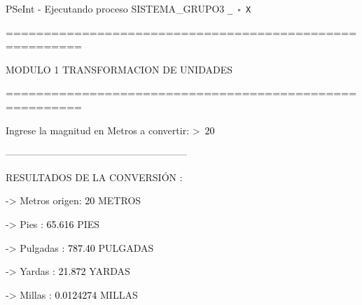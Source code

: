 \documentclass[12pt,a4paper]{article}
\newcommand{\consola}[1]{\noindent\textcolor{pseString}{#1}}
\newcommand{\entrada}[1]{\textcolor{black}{#1}}
\newenvironment{PSeIntWindow}{%
	\begin{tcolorbox}[
		breakable,
		enhanced,
		colback=white,
		colframe=black!60,
		boxrule=0.5pt,
		arc=1mm,
		left=0mm,
		right=0mm,
		top=0mm,
		bottom=2mm,
		width=\textwidth
		]
	}{%
	\end{tcolorbox}
}
\newcommand{\BarraPSeInt}{%
	\colorbox{gray!20}{%
		\parbox{\dimexpr\textwidth-2\fboxsep\relax}{%
			\small
			\textcolor{pseString}{\faPlayCircle}
			\hspace{0.3em}
			PSeInt - Ejecutando proceso SISTEMA\_GRUPO3
			\hfill
			\texttt{\_ \hspace{0.5em} \(\square\) \hspace{0.5em} X}
		}
	}
}
\begin{document}
	\begin{PSeIntWindow}
		
		\BarraPSeInt
		
		\vspace{0.2cm}
		
		\ttfamily
		\small
		
		\consola{========================================================}\par
		
		\begin{center}
			\textcolor{pseString}{MODULO 1 \hspace{1cm} TRANSFORMACION DE UNIDADES}
		\end{center}
		
		\consola{========================================================}\par
		
		\vspace{0.4cm}
		
		\consola{Ingrese la magnitud en Metros a convertir: \textgreater\ }\entrada{20}\par
		
		\vspace{0.4cm}
		
		\consola{--------------------------------------------------------}\par
		
		\vspace{0.2cm}
		
		\consola{RESULTADOS DE LA CONVERSIÓN :}\par
		
		\vspace{0.2cm}
		
		\consola{\hspace*{0.5cm}-> Metros origen: }\entrada{20}\consola{ METROS}\par
		
		\consola{\hspace*{0.5cm}-> Pies : }\entrada{65.616}\consola{ PIES}\par
		
		\consola{\hspace*{0.5cm}-> Pulgadas : }\entrada{787.40}\consola{ PULGADAS}\par
		
		\consola{\hspace*{0.5cm}-> Yardas : }\entrada{21.872}\consola{ YARDAS}\par
		
		\consola{\hspace*{0.5cm}-> Millas : }\entrada{0.0124274}\consola{ MILLAS}\par
		

\end{PSeIntWindow}
\end{document}
